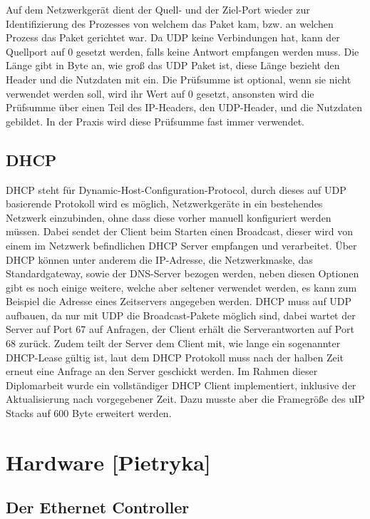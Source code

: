 \documentclass[a4paper,14pt,headsepline]{scrartcl}
\begin{document}
Auf dem Netzwerkgerät dient der Quell- und der Ziel-Port wieder zur Identifizierung des Prozesses von welchem das Paket kam, bzw. an welchen Prozess das Paket gerichtet war. Da UDP keine Verbindungen hat, kann der Quellport auf 0 gesetzt werden, falls keine Antwort empfangen werden muss. Die Länge gibt in Byte an, wie groß das UDP Paket ist, diese Länge bezieht den Header und die Nutzdaten mit ein. Die Prüfsumme ist optional, wenn sie nicht verwendet werden soll, wird ihr Wert auf 0 gesetzt, ansonsten wird die Prüfsumme über einen Teil des IP-Headers, den UDP-Header, und die Nutzdaten gebildet. In der Praxis wird diese Prüfsumme fast immer verwendet.


\subsection{DHCP}
DHCP steht für Dynamic-Host-Configuration-Protocol, durch dieses auf UDP basierende Protokoll wird es möglich, Netzwerkgeräte in ein bestehendes Netzwerk einzubinden, ohne dass diese vorher manuell konfiguriert werden müssen. Dabei sendet der Client beim Starten einen Broadcast, dieser wird von einem im Netzwerk befindlichen DHCP Server empfangen und verarbeitet. Über DHCP können unter anderem die IP-Adresse, die Netzwerkmaske, das Standardgateway, sowie der DNS-Server bezogen werden, neben diesen Optionen gibt es noch einige weitere, welche aber seltener verwendet werden, es kann zum Beispiel die Adresse eines Zeitservers angegeben werden. DHCP muss auf UDP aufbauen, da nur mit UDP die Broadcast-Pakete möglich sind, dabei wartet der Server auf Port 67 auf Anfragen, der Client erhält die Serverantworten auf Port 68 zurück. Zudem teilt der Server dem Client mit, wie lange ein sogenannter DHCP-Lease gültig ist, laut dem DHCP Protokoll muss nach der halben Zeit erneut eine Anfrage an den Server geschickt werden. Im Rahmen dieser Diplomarbeit wurde ein vollständiger DHCP Client implementiert, inklusive der Aktualisierung nach vorgegebener Zeit. Dazu musste aber die Framegröße des uIP Stacks auf 600 Byte erweitert werden.

\newpage
\section{Hardware [Pietryka]}
\subsection{Der Ethernet Controller}
\end{document}

